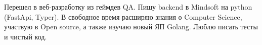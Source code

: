 \hspace{0.2in}Перешел в веб-разработку из геймдев QA. Пишу backend в Mindsoft на python (FastApi, Typer).
В свободное время расширяю знания о Computer Science, участвую в Open source, а также изучаю новый ЯП Golang.
Люблю писать тесты и чистый код.
